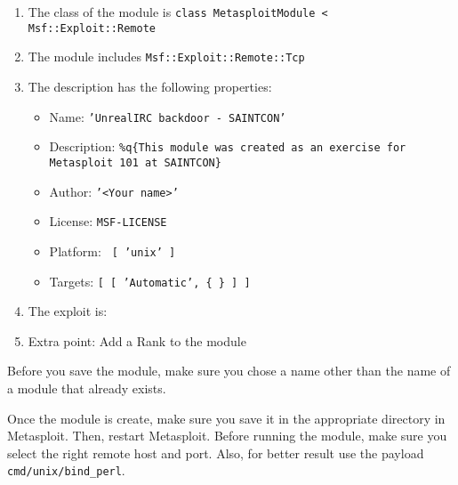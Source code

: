 \begin{enumerate}
    \item The class of the module is \texttt{class MetasploitModule < Msf::Exploit::Remote}
    \item The module includes \texttt{Msf::Exploit::Remote::Tcp}
    \item The description has the following properties: 
        \begin{itemize}
            \item Name: \texttt{'UnrealIRC backdoor - SAINTCON'}
            \item Description: \texttt{\%q\{This module was created as an exercise for Metasploit 101 at SAINTCON\}}
            \item Author: \texttt{'<Your name>'}
            \item License: \texttt{MSF-LICENSE}
            \item Platform: \texttt{ [ 'unix' ]}
            \item Targets: \texttt{[ [ 'Automatic', \{ \} ] ]}
        \end{itemize}
    \item The exploit is: 
        \begin{listingbox}
            
        \end{listingbox}
    \item Extra point: Add a Rank to the module
\end{enumerate}

\begin{warnbox}[frametitle=Warning: Saving the module]
    Before you save the module, make sure you chose a name other than the name of a module that already exists.
\end{warnbox}

Once the module is create, make sure you save it in the appropriate directory in Metasploit. Then, restart Metasploit. Before running the module, make sure you select the right remote host and port. Also, for better result use the payload \texttt{cmd/unix/bind\_perl}.